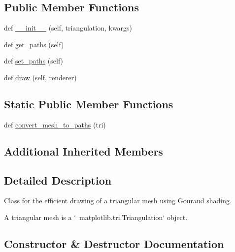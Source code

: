 \subsection*{Public Member Functions}
\begin{DoxyCompactItemize}
\item 
def \hyperlink{classmatplotlib_1_1collections_1_1TriMesh_a2eb69ff204631f236f476a14b1514341}{\+\_\+\+\_\+init\+\_\+\+\_\+} (self, triangulation, kwargs)
\item 
def \hyperlink{classmatplotlib_1_1collections_1_1TriMesh_a957bed430ae9956c172fb90dc46c47c8}{get\+\_\+paths} (self)
\item 
def \hyperlink{classmatplotlib_1_1collections_1_1TriMesh_a24af32e85fa5b29de710119cae0aff63}{set\+\_\+paths} (self)
\item 
def \hyperlink{classmatplotlib_1_1collections_1_1TriMesh_a1fe06ba65fadcbd6c7de143370473956}{draw} (self, renderer)
\end{DoxyCompactItemize}
\subsection*{Static Public Member Functions}
\begin{DoxyCompactItemize}
\item 
def \hyperlink{classmatplotlib_1_1collections_1_1TriMesh_aa2e77241c427696df188e93a395872d9}{convert\+\_\+mesh\+\_\+to\+\_\+paths} (tri)
\end{DoxyCompactItemize}
\subsection*{Additional Inherited Members}


\subsection{Detailed Description}
\begin{DoxyVerb}Class for the efficient drawing of a triangular mesh using Gouraud shading.

A triangular mesh is a `~matplotlib.tri.Triangulation` object.
\end{DoxyVerb}
 

\subsection{Constructor \& Destructor Documentation}
\mbox{\label{classmatplotlib_1_1collections_1_1TriMesh_a2eb69ff204631f236f476a14b1514341}} 
